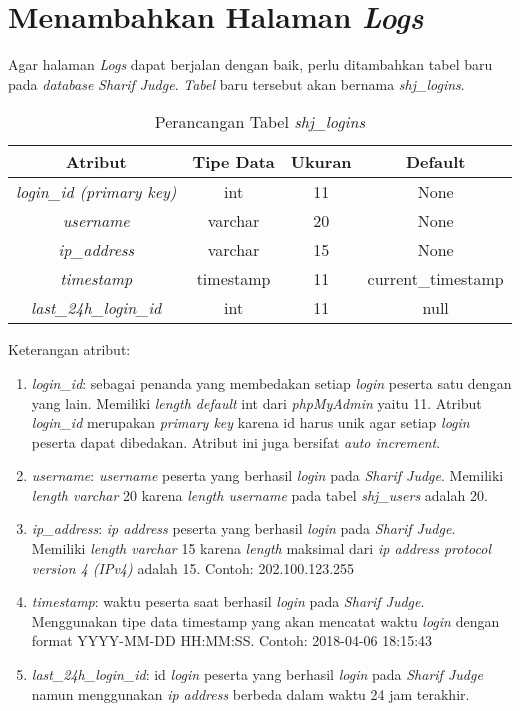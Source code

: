 \section{Menambahkan Halaman \textit{Logs}}%
Agar halaman \textit{Logs} dapat berjalan dengan baik, perlu ditambahkan tabel baru pada \textit{database} \textit{Sharif Judge}.  \textit{Tabel} baru tersebut akan bernama \textit{shj\_logins}. 
\begin{table}[H] %
	\centering 
	\caption{Perancangan Tabel \textit{shj\_logins}}
	\label{tab:tabellogs}
		\begin{tabular}{|c|c|c|c|}
			\hline
			\textbf{Atribut} & \textbf{Tipe Data} & \textbf{Ukuran}  & \textbf{Default} \\
			\hline
			\textit{login\_id (primary key)} & int & 11  & None \\
			\hline
			\textit{username} & varchar & 20  & None \\
			\hline
			\textit{ip\_address} & varchar & 15  & None \\
			\hline
			\textit{timestamp} & timestamp & 11  & current\_timestamp \\
			\hline
			\textit{last\_24h\_login\_id}	 & int & 11  & null \\
			\hline
		\end{tabular}
\end{table}

Keterangan atribut:
\begin{enumerate}
	\item \textit{login\_id}: sebagai penanda yang membedakan setiap \textit{login} peserta satu dengan yang lain. Memiliki \textit{length default} int dari \textit{phpMyAdmin} yaitu 11. Atribut \textit{login\_id} merupakan \textit{primary key} karena id harus unik agar setiap \textit{login} peserta dapat dibedakan. Atribut ini juga bersifat \textit{auto increment}.
	\item \textit{username}: \textit{username} peserta yang berhasil \textit{login} pada \textit{Sharif Judge}. Memiliki \textit{length varchar} 20 karena \textit{length username} pada tabel \textit{shj\_users} adalah 20.
	\item \textit{ip\_address}: \textit{ip address} peserta yang berhasil \textit{login} pada \textit{Sharif Judge}. Memiliki \textit{length varchar} 15 karena \textit{length} maksimal dari \textit{ip address protocol version 4 (IPv4)} adalah 15. Contoh: 202.100.123.255
	\item \textit{timestamp}: waktu peserta saat berhasil \textit{login} pada \textit{Sharif Judge}. Menggunakan tipe data timestamp yang akan mencatat waktu \textit{login} dengan format YYYY-MM-DD HH:MM:SS. Contoh: 2018-04-06 18:15:43
	\item \textit{last\_24h\_login\_id}: id \textit{login} peserta yang berhasil \textit{login} pada \textit{Sharif Judge} namun menggunakan \textit{ip address} berbeda dalam waktu 24 jam terakhir.
\end{enumerate}

